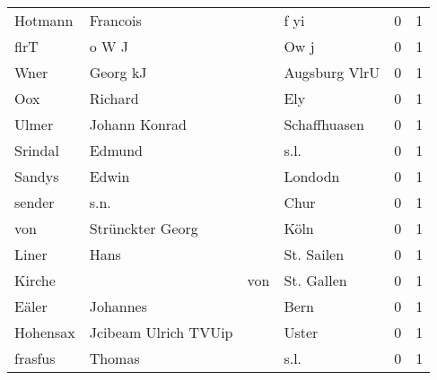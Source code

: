 \documentclass[10pt,a4paper,landscape]{article}
\begin{document}
\begin{longtable}{llllrr}
                  Hotmann &                           Francois &             &                                        f yi &          0 &         1 \\
                     flrT &                              o W J &             &                                        Ow j &          0 &         1 \\
                     Wner &                           Georg kJ &             &                               Augsburg VlrU &          0 &         1 \\
                      Oox &                            Richard &             &                                         Ely &          0 &         1 \\
                    Ulmer &                      Johann Konrad &             &                                Schaffhuasen &          0 &         1 \\
                  Srindal &                             Edmund &             &                                        s.l. &          0 &         1 \\
                   Sandys &                              Edwin &             &                                     Londodn &          0 &         1 \\
                   sender &                               s.n. &             &                                        Chur &          0 &         1 \\
                      von &                   Strünckter Georg &             &                                        Köln &          0 &         1 \\
                    Liner &                               Hans &             &                                  St. Sailen &          0 &         1 \\
                   Kirche &                                    &         von &                                  St. Gallen &          0 &         1 \\
                    Eäler &                           Johannes &             &                                        Bern &          0 &         1 \\
                 Hohensax &               Jcibeam Ulrich TVUip &             &                                       Uster &          0 &         1 \\
                  frasfus &                             Thomas &             &                                        s.l. &          0 &         1 \\

\end{longtable}
\end{document}
